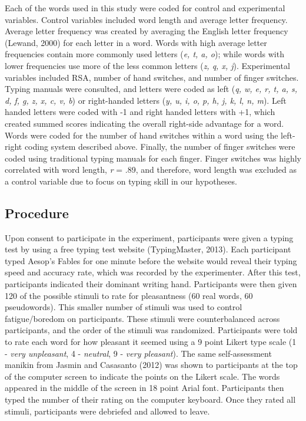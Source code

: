 \documentclass[
  english,
  man,mask]{apa7}
\begin{document}
Each of the words used in this study were coded for control and experimental variables. Control variables included word length and average letter frequency. Average letter frequency was created by averaging the English letter frequency (Lewand, 2000) for each letter in a word. Words with high average letter frequencies contain more commonly used letters (\emph{e, t, a, o}); while words with lower frequencies use more of the less common letters (\emph{z, q, x, j}). Experimental variables included RSA, number of hand switches, and number of finger switches. Typing manuals were consulted, and letters were coded as left (\emph{q, w, e, r, t, a, s, d, f, g, z, x, c, v, b}) or right-handed letters (\emph{y, u, i, o, p, h, j, k, l, n, m}). Left handed letters were coded with -1 and right handed letters with +1, which created summed scores indicating the overall right-side advantage for a word. Words were coded for the number of hand switches within a word using the left-right coding system described above. Finally, the number of finger switches were coded using traditional typing manuals for each finger. Finger switches was highly correlated with word length, \emph{r} = .89, and therefore, word length was excluded as a control variable due to focus on typing skill in our hypotheses.

\hypertarget{procedure}{%
\subsection{Procedure}\label{procedure}}

Upon consent to participate in the experiment, participants were given a typing test by using a free typing test website (TypingMaster, 2013). Each participant typed Aesop's Fables for one minute before the website would reveal their typing speed and accuracy rate, which was recorded by the experimenter. After this test, participants indicated their dominant writing hand. Participants were then given 120 of the possible stimuli to rate for pleasantness (60 real words, 60 pseudowords). This smaller number of stimuli was used to control fatigue/boredom on participants. These stimuli were counterbalanced across participants, and the order of the stimuli was randomized. Participants were told to rate each word for how pleasant it seemed using a 9 point Likert type scale (1 - \emph{very unpleasant}, 4 - \emph{neutral}, 9 - \emph{very pleasant}). The same self-assessment manikin from Jasmin and Casasanto (2012) was shown to participants at the top of the computer screen to indicate the points on the Likert scale. The words appeared in the middle of the screen in 18 point Arial font. Participants then typed the number of their rating on the computer keyboard. Once they rated all stimuli, participants were debriefed and allowed to leave.
\end{document}
